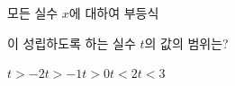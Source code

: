 모든 실수 $x$에 대하여 부등식 \par\smallskip{}\par\smallskip\noindent 이 성립하도록 하는 실수 $t$의 값의 범위는?
\begin{choices32}{$t>-2$}{$t>-1$}{$t>0$}{$t<2$}{$t<3$}\end{choices32}

